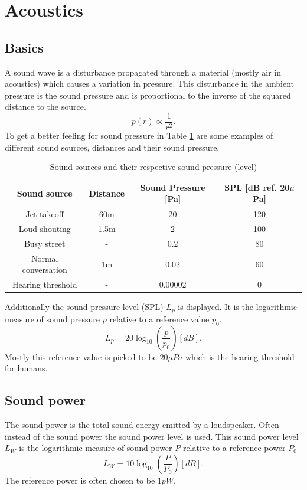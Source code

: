 \section{Acoustics}
\subsection{Basics}
A sound wave is a disturbance propagated through  a material (mostly air in acoustics) which causes a variation in pressure.
This disturbance in the ambient pressure is the sound pressure and is proportional to the inverse of the squared distance to the source.\cite{BERANEK20121}
\begin{equation}\label{2_Acoustics_eq:Pressure_sphere}
    p(r) \propto \frac{1}{r^2}.
\end{equation}
To get a better feeling for sound pressure in Table \ref{2_Acoustics_tab:Sound_pressure_level} are some examples of different sound sources, distances and their sound pressure. \cite{rossing1990science}
\begin{center}
\begin{table}[]
    \centering
    \begin{tabular}{| c | c | c | c |} 
     \hline 
     Sound source & Distance & Sound Pressure [Pa] & SPL [dB ref. 20$\mu$Pa] \\ 
     \hline
     Jet takeoff & 60m & 20 & 120 \\  
     Loud shouting & 1.5m & 2 & 100 \\
     Busy street & - & 0.2 & 80 \\
     Normal conversation & 1m & 0.02 & 60 \\
     Hearing threshold & - & 0.00002 & 0 \\
      \hline
    \end{tabular}
    \caption{Sound sources and their respective sound pressure (level)}
    \label{2_Acoustics_tab:Sound_pressure_level}
\end{table}
\end{center}
Additionally the sound pressure level (SPL) $L_p$ is displayed. It is the logarithmic measure of sound pressure $p$ relative to a reference value $p_0$.
\begin{equation}
    L_p 
    =
    20 \log_{10} \left ( \frac{p}{p_0} \right ) [dB].
\end{equation}
Mostly this reference value is picked to be $20 \mu Pa$ which is the hearing threshold for humans. \cite{rossing1990science}
\subsection{Sound power}
The sound power is the total sound energy emitted by a loudspeaker. Often instead of the sound power the sound power level is used. This sound power level $L_W$ is the logarithmic measure of sound power $P$ relative to a reference power $P_0$
\begin{equation}
    L_W = 10\log_{10} \left (  \frac{P}{P_0} \right ) [dB].
\end{equation}
The reference power is often chosen to be $1pW$. \cite{rossing1990science}
